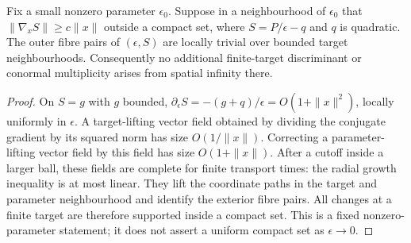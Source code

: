 \begin{lemma}
\label{lem:nospatialinfinity}
Fix a small nonzero parameter $\epsilon_0$. Suppose in a neighbourhood
of $\epsilon_0$ that $\|\nabla_x S\|\ge c\|x\|$ outside a compact set,
where $S=P/\epsilon-q$ and $q$ is quadratic. The outer fibre pairs of
$(\epsilon,S)$ are locally trivial over bounded target neighbourhoods.
Consequently no additional finite-target discriminant or conormal
multiplicity arises from spatial infinity there.
\end{lemma}
\begin{proof}
On $S=g$ with $g$ bounded,
$\partial_\epsilon S=-(g+q)/\epsilon=O(1+\|x\|^2)$,
locally uniformly in $\epsilon$. A target-lifting vector field obtained
by dividing the conjugate gradient by its squared norm has size
$O(1/\|x\|)$. Correcting a parameter-lifting vector field by this
field has size $O(1+\|x\|)$. After a cutoff inside a larger ball,
these fields are complete for finite transport times: the radial
growth inequality is at most linear. They lift the coordinate paths
in the target and parameter neighbourhood and identify the exterior
fibre pairs. All changes at a finite target are therefore supported
inside a compact set. This is a fixed nonzero-parameter statement;
it does not assert a uniform compact set as $\epsilon\to0$.
\end{proof}

